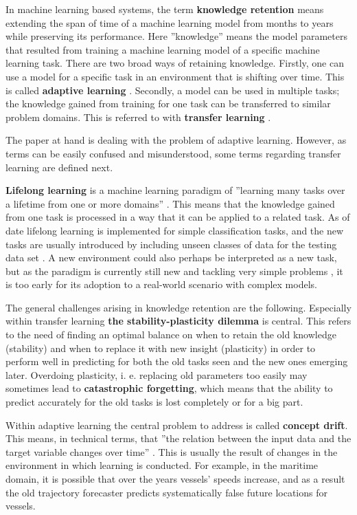 In machine learning based systems, the term \textbf{knowledge retention} means extending the span of time of a machine learning model from months to years while preserving its performance. Here ''knowledge'' means the model parameters that resulted from training a machine learning model of a specific machine learning task. There are two broad ways of retaining knowledge. Firstly, one can use a model for a specific task in an environment that is shifting over time. This is called \textbf{adaptive learning} \cite{conceptdriftsurvey}. Secondly, a model can be used in multiple tasks; the knowledge gained from training for one task can be transferred to similar problem domains. This is referred to with \textbf{transfer learning} \cite{lmlsystems}.

The paper at hand is dealing with the problem of adaptive learning. However, as terms can be easily confused and misunderstood, some terms regarding transfer learning are defined next.

\textbf{Lifelong learning} is a machine learning paradigm of ''learning many tasks over a lifetime from one or more domains'' \cite{lmlsystems}. This means that the knowledge gained from one task is processed in a way that it can be applied to a related task. As of date lifelong learning is implemented for simple classification tasks, and the new tasks are usually introduced by including unseen classes of data for the testing data set \cite{lmlinneuralnets}. A new environment could also perhaps be interpreted as a new task, but as the paradigm is currently still new and tackling very simple problems \cite{lmlinneuralnets}, it is too early for its adoption to a real-world scenario with complex models.

The general challenges arising in knowledge retention are the following. Especially within transfer learning \textbf{the stability-plasticity dilemma} is central. This refers to the need of finding an optimal balance on when to retain the old knowledge (stability) and when to replace it with new insight (plasticity) in order to perform well in predicting for both the old tasks seen and the new ones emerging later. Overdoing plasticity, i. e. replacing old parameters too easily may sometimes lead to \textbf{catastrophic forgetting}, which means that the ability to predict accurately for the old tasks is lost completely or for a big part.

Within adaptive learning the central problem to address is called \textbf{concept drift}. This means, in technical terms, that ''the relation between the input data and the target variable changes over time'' \cite{conceptdriftsurvey}. This is usually the result of changes in the environment in which learning is conducted. For example, in the maritime domain, it is possible that over the years vessels' speeds increase, and as a result the old trajectory forecaster predicts systematically false future locations for vessels.

